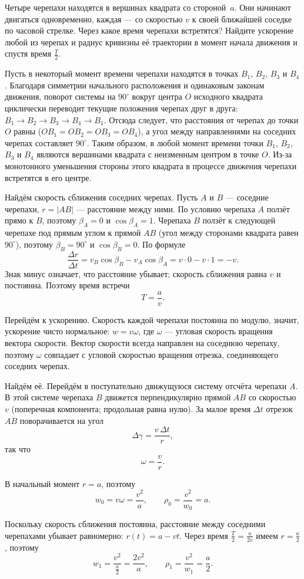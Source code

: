 \documentclass[../main.tex]{subfiles}
\begin{document}
\begin{example}
Четыре черепахи находятся в вершинах квадрата со стороной~$a$. Они
начинают двигаться одновременно, каждая --- со скоростью $v$ к своей
ближайшей соседке по часовой стрелке. Через какое время черепахи
встретятся? Найдите ускорение любой из черепах и радиус кривизны её
траектории в момент начала движения и спустя время $\frac{T}{2}$.

Пусть в некоторый момент времени черепахи находятся в точках
$B_1$, $B_2$, $B_3$ и $B_4$. Благодаря симметрии начального расположения
и одинаковым законам движения, поворот системы на $90^\circ$ вокруг
центра $O$ исходного квадрата циклически переводит текущие положения
черепах друг в друга: $B_1 \to B_2 \to B_3 \to B_4 \to B_1$. Отсюда
следует, что расстояния от черепах до точки $O$ равны
($OB_1 = OB_2 = OB_3 = OB_4$), а угол между направлениями на соседних
черепах составляет $90^\circ$. Таким образом, в любой момент времени
точки $B_1$, $B_2$, $B_3$ и $B_4$ являются вершинами квадрата с
неизменным центром в точке $O$. Из-за монотонного уменьшения стороны
этого квадрата в процессе движения черепахи встретятся в его центре.

Найдём скорость сближения соседних черепах. Пусть $A$ и $B$ --- соседние
черепахи, $r = |AB|$ --- расстояние между ними. По условию черепаха $A$
ползёт прямо к $B$, поэтому $\beta_A = 0$ и $\cos\beta_A = 1$. Черепаха
$B$ ползёт к следующей черепахе под прямым углом к прямой $AB$ (угол
между сторонами квадрата равен $90^\circ$), поэтому $\beta_B = 90^\circ$
и $\cos\beta_B = 0$. По формуле
\[
\frac{\Delta r}{\Delta t} = v_B\cos\beta_B - v_A\cos\beta_A
= v\cdot 0 - v\cdot 1 = -v.
\]
Знак минус означает, что расстояние убывает; скорость сближения равна
$v$ и постоянна. Поэтому время встречи
\[
T = \frac{a}{v}.
\]

Перейдём к ускорению. Скорость каждой черепахи постоянна по модулю,
значит, ускорение чисто нормальное: $w = v\omega$, где $\omega$ ---
угловая скорость вращения вектора скорости. Вектор скорости всегда
направлен на соседнюю черепаху, поэтому $\omega$ совпадает с угловой
скоростью вращения отрезка, соединяющего соседних черепах.

Найдём её. Перейдём в поступательно движущуюся систему отсчёта черепахи
$A$. В этой системе черепаха $B$ движется перпендикулярно прямой $AB$
со скоростью $v$ (поперечная компонента; продольная равна нулю). За
малое время $\Delta t$ отрезок $AB$ поворачивается на угол
\[
\Delta\gamma = \frac{v\,\Delta t}{r},
\]
так что
\[
\omega = \frac{v}{r}.
\]

В начальный момент $r = a$, поэтому
\[
w_0 = v\omega = \frac{v^2}{a},
\qquad
\rho_0 = \frac{v^2}{w_0} = a.
\]

Поскольку скорость сближения постоянна, расстояние между соседними
черепахами убывает равномерно: $r(t) = a - vt$. Через время
$\frac{T}{2} = \frac{a}{2v}$ имеем $r = \frac{a}{2}$, поэтому
\[
w_1 = \frac{v^2}{\frac{a}{2}} = \frac{2v^2}{a},
\qquad
\rho_1 = \frac{v^2}{w_1} = \frac{a}{2}.
\]
\end{example}
%
\end{document}

